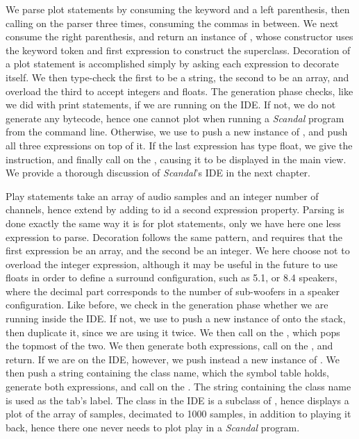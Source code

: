 \newpage

We parse plot statements by consuming the keyword and a left parenthesis, then calling  on the parser three times, consuming the commas in between. We next consume the right parenthesis, and return an instance of , whose constructor uses the keyword token and first expression to construct the superclass. Decoration of a plot statement is accomplished simply by asking each expression to decorate itself. We then type-check the first to be a string, the second to be an array, and overload the third to accept integers and floats. The generation phase checks, like we did with print statements, if we are running on the IDE. If not, we do not generate any bytecode, hence one cannot plot when running a \emph{Scandal} program from the command line. Otherwise, we use  to push a new instance of , and push all three expressions on top of it. If the last expression has type float, we give the  instruction, and finally call  on the , causing it to be displayed in the main view. We provide a thorough discussion of \emph{Scandal}'s IDE in the next chapter.

Play statements take an array of audio samples and an integer number of channels, hence extend  by adding to id a second expression property. Parsing is done exactly the same way it is for plot statements, only we have here one less expression to parse. Decoration follows the same pattern, and requires that the first expression be an array, and the second be an integer. We here choose not to overload the integer expression, although it may be useful in the future to use floats in order to define a surround configuration, such as 5.1, or 8.4 speakers, where the decimal part corresponds to the number of sub-woofers in a speaker configuration. Like before, we check in the generation phase whether we are running inside the IDE. If not, we use  to push a new instance of  onto the stack, then duplicate it, since we are using it twice. We then call  on the , which pops the topmost of the two. We then generate both expressions, call  on the , and return. If we are on the IDE, however, we push instead a new instance of . We then push a string containing the class name, which the symbol table holds, generate both expressions, and call  on the . The string containing the class name is used as the tab's label. The  class in the IDE is a subclass of , hence displays a plot of the array of samples, decimated to 1000 samples, in addition to playing it back, hence there one never needs to plot  play in a \emph{Scandal} program.

